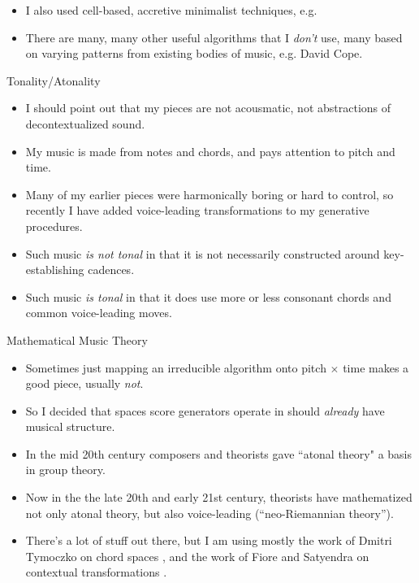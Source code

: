 \documentclass{beamer}
\begin{document}
\begin{frame}[allowframebreaks]
\begin{itemize}
		\item
			I also used cell-based, accretive minimalist techniques, e.g. 
		\item
			There are many, many other useful algorithms that I \textit{don't} use, many based on varying patterns from existing bodies of music, e.g. David Cope.
  	\end{itemize}
\end{frame}

\begin{frame}{Tonality/Atonality}
	\begin{itemize}
		\item
			I should point out that my pieces are not acousmatic, not abstractions of decontextualized sound.
		\item
			My music is made from notes and chords, and pays attention to pitch and time.
		\item
			Many of my earlier pieces were harmonically boring or hard to control, so recently I have added voice-leading transformations to my generative procedures.
		\item
			Such music \emph{is not tonal} in that it is not necessarily constructed around key-establishing cadences.
		\item
			Such music \emph{is tonal} in that it does use more or less consonant chords and common voice-leading moves.
	\end{itemize}
\end{frame}

\begin{frame}{Mathematical Music Theory}
  \begin{itemize}
  \item
    Sometimes just mapping an irreducible algorithm onto pitch $\times$ time makes a good piece, usually \textit{not}.
  \item
    So I decided that spaces score generators operate in should \textit{already} have musical structure.
  \item
    In the mid 20th century composers and theorists gave ``atonal theory" a basis in group theory.
   \item
    Now in the the late 20th and early 21st century, theorists have mathematized not only atonal theory, but also voice-leading (``neo-Riemannian theory'').
  \item
	There's a lot of stuff out there, but I am using mostly the work of Dmitri Tymoczko on chord spaces \cite{T2006} \cite{CQT2008}, and the work of Fiore and Satyendra on contextual transformations \cite{FS2005}.
  \end{itemize}
\end{frame}
\end{document}
